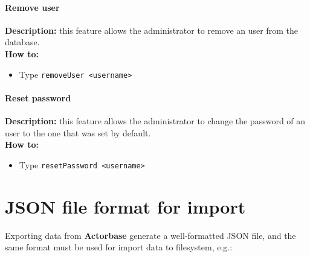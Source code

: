 \documentclass{scalatekids-article}
\begin{document}
\paragraph{Remove user}
\label{sec:removeuser}
\textbf{Description:} this feature allows the administrator to remove an user from the database.\\
\textbf{How to:}
\begin{itemize}
\item Type \texttt{removeUser <username>}
\end{itemize}

\paragraph{Reset password}
\label{sec:resetpassword}
\textbf{Description:} this feature allows the administrator to change the password of an user to the one that was set by default.\\
\textbf{How to:}
\begin{itemize}
\item Type \texttt{resetPassword <username>}
\end{itemize}

\newpage
\appendix

\section{JSON file format for import}
\label{sec:JSONFormat}

Exporting data from \textbf{Actorbase} generate a well-formatted JSON file, and the same format must be
used for import data to filesystem, e.g.:


\listoftables

\listoffigures
\end{document}
